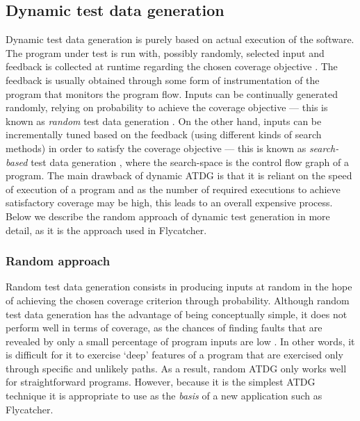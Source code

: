 \subsection{Dynamic test data generation}

Dynamic test data generation is purely based on actual execution of the software. The program under test is run with, possibly randomly, selected input and feedback is collected at runtime regarding the chosen coverage objective \cite{edvardsson1999survey}. The feedback is usually obtained through some form of instrumentation of the program that monitors the program flow. Inputs can be continually generated randomly, relying on probability to achieve the coverage objective --- this is known as \emph{random} test data generation \cite{edvardsson1999survey}. On the other hand, inputs can be incrementally tuned based on the feedback (using different kinds of search methods) in order to satisfy the coverage objective --- this is known as \emph{search-based} test data generation \cite{mcminn2004search}, where the search-space is the control flow graph of a program. The main drawback of dynamic ATDG is that it is reliant on the speed of execution of a program and as the number of required executions to achieve satisfactory coverage may be high, this leads to an overall expensive process. Below we describe the random approach of dynamic test generation in more detail, as it is the approach used in \textsf{Flycatcher}.


\subsubsection{Random approach}

Random test data generation consists in producing inputs at random in the hope of achieving the chosen coverage criterion through probability. Although random test data generation has the advantage of being conceptually simple, it does not perform well in terms of coverage, as the chances of finding faults that are revealed by only a small percentage of program inputs are low \cite{edvardsson1999survey}. In other words, it is difficult for it to exercise `deep' features of a program that are exercised only through specific and unlikely paths. As a result, random ATDG only works well for straightforward programs. However, because it is the simplest ATDG technique it is appropriate to use as the \emph{basis} of a new application such as \textsf{Flycatcher}.

